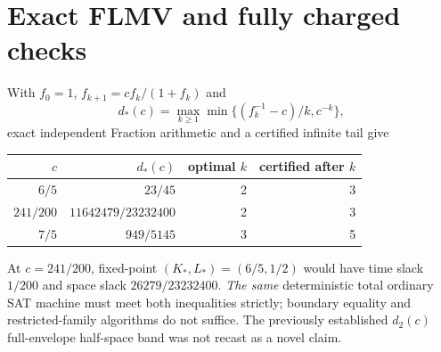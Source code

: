 \documentclass[10pt]{article}
\begin{document}
\section{Exact FLMV and fully charged checks}
With $f_0=1$, $f_{k+1}=cf_k/(1+f_k)$ and
\[d_*(c)=\max_{k\ge1}\min\{(f_k^{-1}-c)/k,c^{-k}\},\]
exact independent Fraction arithmetic and a certified infinite tail give
\begin{center}\begin{tabular}{rrrr}\toprule
$c$ & $d_*(c)$ & optimal $k$ & certified after $k$\\\midrule
$6/5$ & $23/45$ & 2 & 3\\
$241/200$ & $11642479/23232400$ & 2 & 3\\
$7/5$ & $949/5145$ & 3 & 5\\\bottomrule
\end{tabular}\end{center}
At $c=241/200$, fixed-point $(K_*,L_*)=(6/5,1/2)$ would have time slack $1/200$ and space slack $26279/23232400$. \emph{The same} deterministic total ordinary SAT machine must meet both inequalities strictly; boundary equality and restricted-family algorithms do not suffice. The previously established $d_2(c)$ full-envelope half-space band was not recast as a novel claim.
\end{document}
